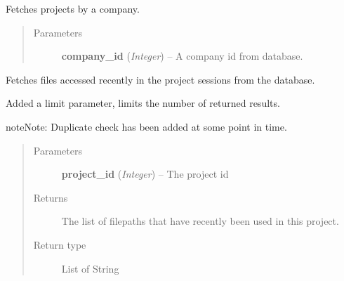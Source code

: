 \documentclass[letterpaper,10pt,english]{sphinxmanual}
\begin{document}

\begin{fulllineitems}
\label{controller:controller.project.get_projects_by_company}
Fetches projects by a company.
\begin{quote}\begin{description}
\item[{Parameters}] \leavevmode
\textbf{company\_id} (\emph{Integer}) -- A company id from database.

\end{description}\end{quote}

\end{fulllineitems}


\begin{fulllineitems}
\label{controller:controller.project.get_recent_files}
Fetches files accessed recently in the project sessions from the database.

Added a limit parameter, limits the number of returned results.

\begin{notice}{note}{Note:}
Duplicate check has been added at some point in time.
\end{notice}
\begin{quote}\begin{description}
\item[{Parameters}] \leavevmode
\textbf{project\_id} (\emph{Integer}) -- The project id

\item[{Returns}] \leavevmode
The list of filepaths that have recently been used in this project.

\item[{Return type}] \leavevmode
List of String

\end{description}\end{quote}

\end{fulllineitems}

\end{document}
